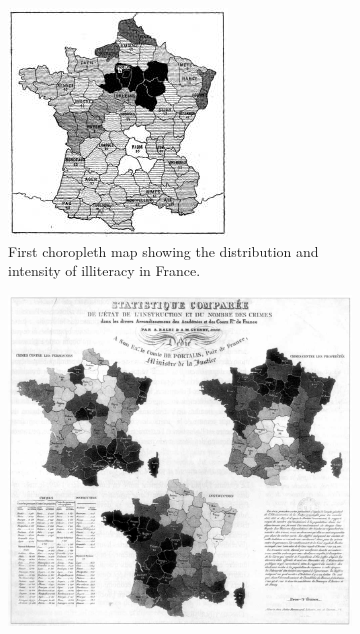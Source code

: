 \begin{figure}[!htb]
  \captionsetup[subfigure]{justification=centering}
  \centering
  \begin{subfigure}[t]{0.4\textwidth}
    \includegraphics[width=\textwidth]{images/history/dupin.jpg}
    \caption{First choropleth map showing the distribution and intensity of illiteracy in France.}
    \label{fig:first-choropleth}
  \end{subfigure}
  \hfill
  \begin{subfigure}[t]{0.4\textwidth}
    \includegraphics[width=\textwidth]{images/history/second-choropleth.jpg}

\end{subfigure}
\end{figure}
